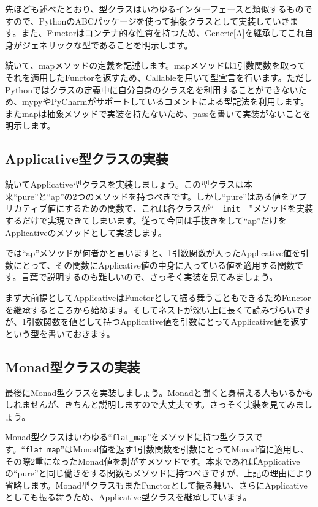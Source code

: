 
先ほども述べたとおり、型クラスはいわゆるインターフェースと類似するものですので、PythonのABCパッケージを使って抽象クラスとして実装していきます。また、Functorはコンテナ的な性質を持つため、Generic[A]を継承してこれ自身がジェネリックな型であることを明示します。

続いて、mapメソッドの定義を記述します。mapメソッドは1引数関数を取ってそれを適用したFunctorを返すため、Callableを用いて型宣言を行います。ただしPythonではクラスの定義中に自分自身のクラス名を利用することができないため、mypyやPyCharmがサポートしているコメントによる型記法を利用します。またmapは抽象メソッドで実装を持たないため、passを書いて実装がないことを明示します。

\subsection{Applicative型クラスの実装}
続いてApplicative型クラスを実装しましょう。この型クラスは本来``pure''と``ap''の2つのメソッドを持つべきです。しかし``pure''はある値をアプリカティブ値にするための関数で、これは各クラスが``\verb+__init__+''メソッドを実装するだけで実現できてしまいます。従って今回は手抜きをして``ap''だけをApplicativeのメソッドとして実装します。

では``ap''メソッドが何者かと言いますと、1引数関数が入ったApplicative値を引数にとって、その関数にApplicative値の中身に入っている値を適用する関数です。言葉で説明するのも難しいので、さっそく実装を見てみましょう。


まず大前提としてApplicativeはFunctorとして振る舞うこともできるためFunctorを継承するところから始めます。そしてネストが深い上に長くて読みづらいですが、1引数関数を値として持つApplicative値を引数にとってApplicative値を返すという型を書いておきます。

\subsection{Monad型クラスの実装}
最後にMonad型クラスを実装しましょう。Monadと聞くと身構える人もいるかもしれませんが、きちんと説明しますので大丈夫です。さっそく実装を見てみましょう。


Monad型クラスはいわゆる``\verb+flat_map+''をメソッドに持つ型クラスです。``\verb+flat_map+''はMonad値を返す1引数関数を引数にとってMonad値に適用し、その際2重になったMonad値を剥がすメソッドです。本来であればApplicativeの``pure''と同じ働きをする関数もメソッドに持つべきですが、上記の理由により省略します。Monad型クラスもまたFunctorとして振る舞い、さらにApplicativeとしても振る舞うため、Applicative型クラスを継承しています。

